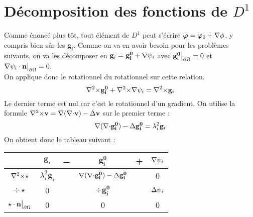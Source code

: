 \section{Décomposition des fonctions de $D^1$}
\label{decomp}

Comme énoncé plus tôt, tout élément de $D^1$ peut s'écrire $\bm{\varphi} = \bm{\varphi}_0 + {\nabla}\phi$, y compris bien sûr les $\mathbf{g}_i$. Comme on va en avoir besoin pour les problèmes suivants, on va les décomposer en $\mathbf{g}_i=\mathbf{g_i^0}+{\nabla}\psi_i$ avec $\mathbf{g_i^0}{\big\rvert_{\partial\Omega}} = 0$ et ${\nabla}\psi_i\cdot \mathbf{n}{\big\rvert_{\partial\Omega}} = 0$.\\
On applique donc le rotationnel du rotationnel sur cette relation.\\
\[ {\nabla^2\times} \mathbf{g_i^0} +{\nabla^2\times}{\nabla}\psi_i = {\nabla^2\times} \mathbf{g}_i \]
Le dernier terme est nul car c'est le rotationnel d'un gradient. On utilise la formule ${\nabla^2\times} \mathbf{v}={\nabla}({\nabla\cdot} \mathbf{v})-{\Delta} \mathbf{v}$ sur le premier terme :
\[ {\nabla}({\nabla\cdot} \mathbf{g_i^0})-{\Delta} \mathbf{g_i^0} = \lambda_i^2 \mathbf{g}_i \]
On obtient donc le tableau suivant :
\begin{center}
\begin{tabular}{c|ccccc}
& $\mathbf{g}_i$ & = & $\mathbf{g_i^0}$ & + & ${\nabla}\psi_i$ \\ \hline
${\nabla^2\times}\star$ & $\lambda_i^2\mathbf{g}_i$ & & ${\nabla}({\nabla\cdot} \mathbf{g_i^0})-{\Delta} \mathbf{g_i^0}$ & & 0\\ \hline
$\div\star$ & 0 & & $\div \mathbf{g_i^0}$ & & ${\Delta}\psi_i$\\ \hline
$\star\cdot \mathbf{n}{\big\rvert_{\partial\Omega}}$ & 0 & & 0 & & 0
\end{tabular}
\end{center}


